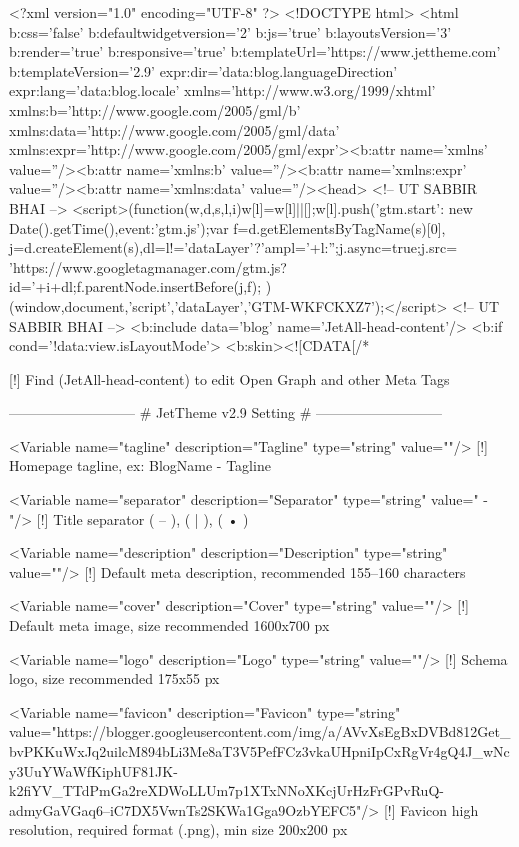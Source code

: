 <?xml version="1.0" encoding="UTF-8" ?>
<!DOCTYPE html>
<html b:css='false' b:defaultwidgetversion='2' b:js='true' b:layoutsVersion='3' b:render='true' b:responsive='true' b:templateUrl='https://www.jettheme.com' b:templateVersion='2.9' expr:dir='data:blog.languageDirection' expr:lang='data:blog.locale' xmlns='http://www.w3.org/1999/xhtml' xmlns:b='http://www.google.com/2005/gml/b' xmlns:data='http://www.google.com/2005/gml/data' xmlns:expr='http://www.google.com/2005/gml/expr'><b:attr name='xmlns' value=''/><b:attr name='xmlns:b' value=''/><b:attr name='xmlns:expr' value=''/><b:attr name='xmlns:data' value=''/><head>
<!--   UT SABBIR BHAI   -->
<script>(function(w,d,s,l,i){w[l]=w[l]||[];w[l].push({'gtm.start':
new Date().getTime(),event:'gtm.js'});var f=d.getElementsByTagName(s)[0],
j=d.createElement(s),dl=l!='dataLayer'?'ampl='+l:'';j.async=true;j.src=
'https://www.googletagmanager.com/gtm.js?id='+i+dl;f.parentNode.insertBefore(j,f);
})(window,document,'script','dataLayer','GTM-WKFCKXZ7');</script>
<!--   UT SABBIR BHAI   -->
<b:include data='blog' name='JetAll-head-content'/>
<b:if cond='!data:view.isLayoutMode'>
<b:skin><![CDATA[/*

[!] Find (JetAll-head-content) to edit Open Graph and other Meta Tags

---------------------------
# JetTheme v2.9 Setting #
---------------------------

<Variable name="tagline" description="Tagline" type="string" value=""/>
[!] Homepage tagline, ex: BlogName - Tagline

<Variable name="separator" description="Separator" type="string" value=" - "/>
[!] Title separator ( – ), ( | ), ( • )

<Variable name="description" description="Description" type="string" value=""/>
[!] Default meta description, recommended 155–160 characters

<Variable name="cover" description="Cover" type="string" value=""/>
[!] Default meta image, size recommended 1600x700 px

<Variable name="logo" description="Logo" type="string" value=""/>
[!] Schema logo, size recommended 175x55 px

<Variable name="favicon" description="Favicon" type="string" value="https://blogger.googleusercontent.com/img/a/AVvXsEgBxDVBd812Get_bvPKKuWxJq2uilcM894bLi3Me8aT3V5PefFCz3vkaUHpniIpCxRgVr4gQ4J_wNcy3UuYWaWfKiphUF81JK-k2fiYV_TTdPmGa2reXDWoLLUm7p1XTxNNoXKcjUrHzFrGPvRuQ-admyGaVGaq6--iC7DX5VwnTs2SKWa1Gga9OzbYEFC5"/>
[!] Favicon high resolution, required format (.png), min size 200x200 px

